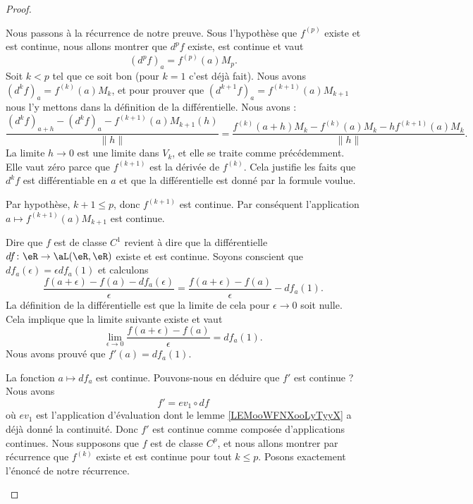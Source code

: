 \begin{proof}
\begin{subproof}
		Nous passons à la récurrence de notre preuve. Sous l'hypothèse que \( f^{(p)}\) existe et est continue, nous allons montrer que \( d^pf\) existe, est continue et vaut
		\begin{equation}
			(d^pf)_a=f^{(p)}(a)M_p.
		\end{equation}
		Soit \( k<p\) tel que ce soit bon (pour \( k=1\) c'est déjà fait). Nous avons \( (d^kf)_a=f^{(k)}(a)M_k\), et pour prouver que \( (d^{k+1}f)_a=f^{(k+1)}(a)M_{k+1}\) nous l'y mettons dans la définition de la différentielle. Nous avons :
		\begin{equation}
			\frac{ (d^kf)_{a+h}-(d^kf)_a-f^{(k+1)}(a)M_{k+1}(h) }{ \| h \| }=\frac{ f^{(k)}(a+h)M_k-f^{(k)}(a)M_k-hf^{(k+1)}(a)M_k }{ \| h \| }.
		\end{equation}
		La limite \( h\to 0\) est une limite dans \( V_k\), et elle se traite comme précédemment. Elle vaut zéro parce que \( f^{(k+1)}\) est la dérivée de \( f^{(k)}\). Cela justifie les faits que \( d^kf\) est différentiable en \( a\) et que la différentielle est donné par la formule voulue.

		Par hypothèse, \( k+1\leq p\), donc \( f^{(k+1)}\) est continue. Par conséquent l'application \( a\mapsto f^{(k+1)}(a)M_{k+1}\) est continue.

		Dire que \( f\) est de classe \( C^1\) revient à dire que la différentielle \( df\colon \eR\to \aL(\eR,\eR)\) existe et est continue. Soyons conscient que \( df_a(\epsilon)=\epsilon df_a(1)\) et calculons
		\begin{equation}
			\frac{ f(a+\epsilon)-f(a)-df_a(\epsilon) }{ \epsilon }=\frac{ f(a+\epsilon)-f(a) }{ \epsilon }-df_a(1).
		\end{equation}
		La définition de la différentielle est que la limite de cela pour \( \epsilon\to 0\) soit nulle. Cela implique que la limite suivante existe et vaut
		\begin{equation}
			\lim_{\epsilon\to 0}\frac{ f(a+\epsilon)-f(a) }{ \epsilon }=df_a(1).
		\end{equation}
		Nous avons prouvé que \( f'(a)=df_a(1)\).

		La fonction \( a\mapsto df_a\) est continue. Pouvons-nous en déduire que \( f'\) est continue ? Nous avons
		\begin{equation}
			f'=ev_1\circ df
		\end{equation}
		où \( ev_1\) est l'application d'évaluation dont le lemme \ref{LEMooWFNXooLyTyyX} a déjà donné la continuité. Donc \( f'\) est continue comme composée d'applications continues.
		Nous supposons que \( f\) est de classe \( C^p\), et nous allons montrer par récurrence que \( f^{(k)}\) existe et est continue pour tout \( k\leq p\). Posons exactement l'énoncé de notre récurrence.


\end{subproof}
\end{proof}
